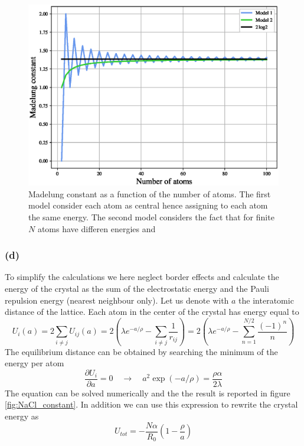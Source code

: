 \documentclass{article}
\begin{document}
\begin{figure}[h]
    \centering 
    \includegraphics[scale=0.7]{figures/madelung.eps}
    \caption{Madelung constant as a function of the number of atoms. The first model consider each atom as central hence assigning to each atom the same energy. The second model considers the fact that for finite $N$ atoms have
    differen energies and }
    \label{fig:Madelung_constant_Natoms}
\end{figure}

\subsubsection*{(d)}
To simplify the calculations we here neglect border effects and calculate the energy of the crystal as the sum of the electrostatic energy and the Pauli repulsion energy (nearest neighbour only). Let us denote with $a$ the interatomic distance of the lattice. Each atom in the center of the crystal has energy equal to
\begin{equation*}
    U_i(a) = 2 \sum_{i \neq j}U_{ij}(a) = 2\left(\lambda e^{-a/\rho} - \sum_{i \neq j}\frac{1}{r_{ij}}\right) = 
    2\left(\lambda e^{-a/\rho} - \sum_{n=1}^{N/2}\frac{(-1)^{n}}{n}\right)
\end{equation*}
The equilibrium distance can be obtained by searching the minimum of the energy per atom
\begin{equation*}
    \frac{\partial U_i}{\partial a} = 0 \quad \longrightarrow \quad a^2\exp(-a/\rho) = \frac{\rho \alpha}{2\lambda}
\end{equation*}
The equation can be solved numerically and the the result is reported in figure \ref{fig:NaCl_constant}. In addition we can use this 
expression to rewrite the crystal energy as 
\begin{equation*}
    U_{tot} = -\frac{N\alpha}{R_0} \left(1-\frac{\rho}{a}\right)
\end{equation*}
\end{document}
